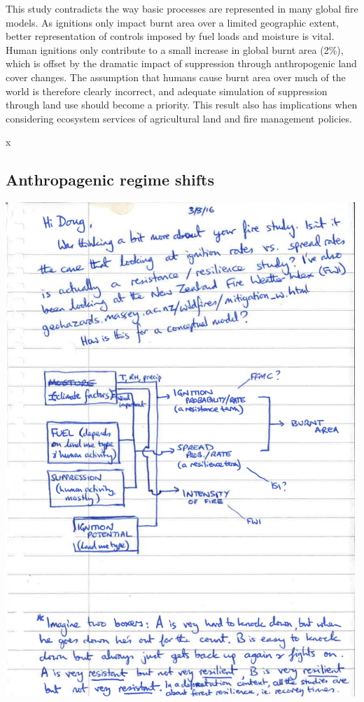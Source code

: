 \documentclass[12pt]{article}
\begin{document}
This study contradicts the way basic processes are represented in many global fire models. As ignitions only
impact burnt area over a limited geographic extent, better representation of controls imposed by fuel loads
and moisture is vital. Human ignitions only contribute to a small increase in global burnt area (2\%), which is
offset by the dramatic impact of suppression through anthropogenic land cover changes. The assumption
that humans cause burnt area over much of the world is therefore clearly incorrect, and adequate simulation
of suppression through land use should become a priority. This result also has implications when considering
ecosystem services of agricultural land and fire management policies.

\pagebreak
x
\pagebreak
\subsection{Anthropagenic regime shifts}
\includegraphics[width=0.99\textwidth]{tobys_notes.pdf}




\end{document}
